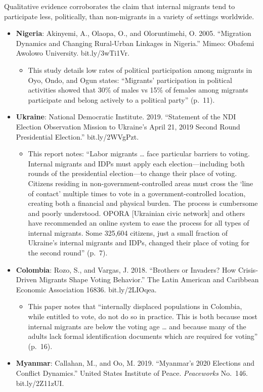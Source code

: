 \documentclass[
  11.5pt,
]{article}
\providecommand{\tightlist}{%
  \setlength{\itemsep}{0pt}\setlength{\parskip}{0pt}}
\begin{document}
Qualitative evidence corroborates the claim that internal migrants tend
to participate less, politically, than non-migrants in a variety of
settings worldwide.

\begin{itemize}
\tightlist
\item
  \textbf{Nigeria}: Akinyemi, A., Olaopa, O., and Oloruntimehi, O. 2005.
  ``Migration Dynamics and Changing Rural-Urban Linkages in Nigeria.''
  Mimeo: Obafemi Awolowo University. bit.ly/3wTi1Vr.

  \begin{itemize}
  \tightlist
  \item
    This study details low rates of political participation among
    migrants in Oyo, Ondo, and Ogun states: ``Migrants' participation in
    political activities showed that 30\% of males vs 15\% of females
    among migrants participate and belong actively to a political
    party'' (p.~11).
  \end{itemize}
\item
  \textbf{Ukraine}: National Democratic Institute. 2019. ``Statement of
  the NDI Election Observation Mission to Ukraine's April 21, 2019
  Second Round Presidential Election.'' bit.ly/2WVgPzt.

  \begin{itemize}
  \tightlist
  \item
    This report notes: ``Labor migrants \ldots{} face particular
    barriers to voting. Internal migrants and IDPs must apply each
    election---including both rounds of the presidential election---to
    change their place of voting. Citizens residing in
    non-government-controlled areas must cross the `line of contact'
    multiple times to vote in a government-controlled location, creating
    both a financial and physical burden. The process is cumbersome and
    poorly understood. OPORA {[}Ukrainian civic network{]} and others
    have recommended an online system to ease the process for all types
    of internal migrants. Some 325,604 citizens, just a small fraction
    of Ukraine's internal migrants and IDPs, changed their place of
    voting for the second round'' (p.~7).
  \end{itemize}
\item
  \textbf{Colombia}: Rozo, S., and Vargas, J. 2018. ``Brothers or
  Invaders? How Crisis-Driven Migrants Shape Voting Behavior.'' The
  Latin American and Caribbean Economic Association 16836.
  bit.ly/2LIOqea.

  \begin{itemize}
  \tightlist
  \item
    This paper notes that ``internally displaced populations in
    Colombia, while entitled to vote, do not do so in practice. This is
    both because most internal migrants are below the voting age
    \ldots{} and because many of the adults lack formal identification
    documents which are required for voting'' (p.~16).
  \end{itemize}
\item
  \textbf{Myanmar}: Callahan, M., and Oo, M. 2019. ``Myanmar's 2020
  Elections and Conflict Dynamics.'' United States Institute of Peace.
  \textit{Peaceworks} No.~146. bit.ly/2Z11zUI.


\end{itemize}
\end{document}
